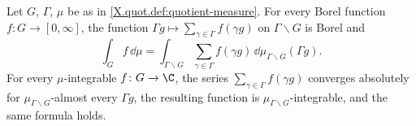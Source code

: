 Let $G$, $\Gamma$, $\mu$ be as in \cref{X.quot.def:quotient-measure}. For every Borel function
$f\colon G\to[0,\infty]$, the function $\Gamma g\mapsto\sum_{\gamma\in\Gamma}f(\gamma g)$ on $\Gamma\backslash G$ is Borel and
\[
  \int_Gf\,\dd\mu=\int_{\Gamma\backslash G}\sum_{\gamma\in\Gamma}f(\gamma g)\,\dd\mu_{\Gamma\backslash G}(\Gamma g).
\]
For every $\mu$-integrable $f\colon G\to\C$, the series $\sum_{\gamma\in\Gamma}f(\gamma g)$ converges absolutely for
$\mu_{\Gamma\backslash G}$-almost every $\Gamma g$, the resulting function is $\mu_{\Gamma\backslash G}$-integrable, and the
same formula holds.
